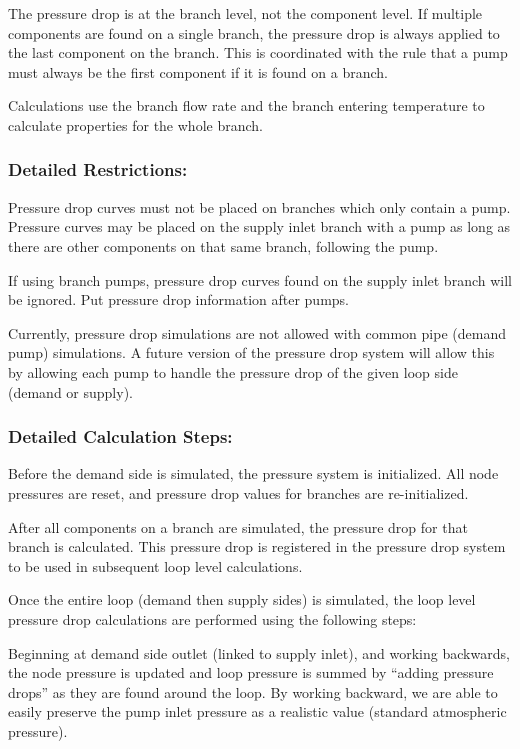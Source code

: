 The pressure drop is at the branch level, not the component level. If multiple components are found on a single branch, the pressure drop is always applied to the last component on the branch. This is coordinated with the rule that a pump must always be the first component if it is found on a branch.

Calculations use the branch flow rate and the branch entering temperature to calculate properties for the whole branch.

\subsubsection{Detailed Restrictions:}\label{detailed-restrictions}

Pressure drop curves must not be placed on branches which only contain a pump. Pressure curves may be placed on the supply inlet branch with a pump as long as there are other components on that same branch, following the pump.

If using branch pumps, pressure drop curves found on the supply inlet branch will be ignored. Put pressure drop information after pumps.

Currently, pressure drop simulations are not allowed with common pipe (demand pump) simulations. A future version of the pressure drop system will allow this by allowing each pump to handle the pressure drop of the given loop side (demand or supply).

\subsubsection{Detailed Calculation Steps:}\label{detailed-calculation-steps}

Before the demand side is simulated, the pressure system is initialized. All node pressures are reset, and pressure drop values for branches are re-initialized.

After all components on a branch are simulated, the pressure drop for that branch is calculated. This pressure drop is registered in the pressure drop system to be used in subsequent loop level calculations.

Once the entire loop (demand then supply sides) is simulated, the loop level pressure drop calculations are performed using the following steps:

Beginning at demand side outlet (linked to supply inlet), and working backwards, the node pressure is updated and loop pressure is summed by ``adding pressure drops'' as they are found around the loop. By working backward, we are able to easily preserve the pump inlet pressure as a realistic value (standard atmospheric pressure).


